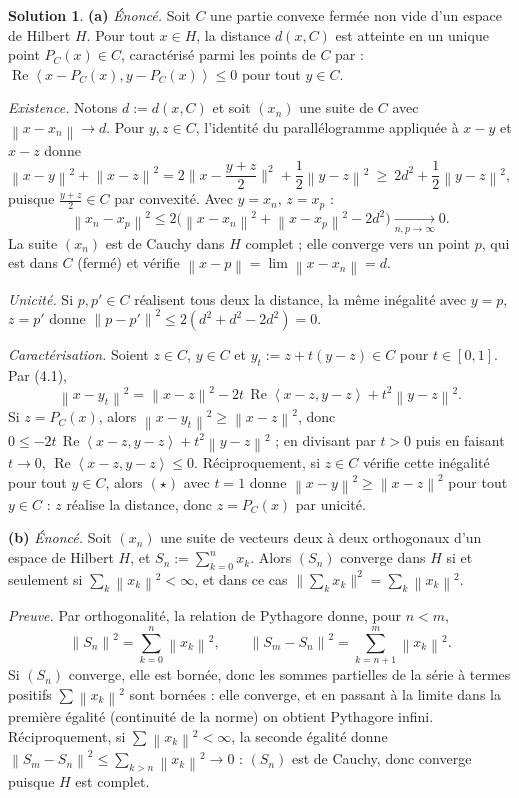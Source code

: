 \documentclass[11pt,a4paper]{article}
\newcommand{\norm}[1]{\left\|#1\right\|}
\newcommand{\ps}[2]{\left\langle #1,#2\right\rangle}
\renewcommand{\Re}{\operatorname{Re}}
\theoremstyle{definition}
\newtheorem*{solution}{Solution}
\begin{document}
\begin{solution}
\noindent\textbf{(a)} \emph{Énoncé.} Soit $C$ une partie convexe fermée non vide d'un espace de Hilbert $H$. Pour tout $x\in H$, la distance $d(x,C)$ est atteinte en un unique point $P_C(x)\in C$, caractérisé parmi les points de $C$ par : $\Re\ps{x-P_C(x)}{y-P_C(x)}\le0$ pour tout $y\in C$.

\emph{Existence.} Notons $d:=d(x,C)$ et soit $(x_n)$ une suite de $C$ avec $\norm{x-x_n}\to d$. Pour $y,z\in C$, l'identité du parallélogramme appliquée à $x-y$ et $x-z$ donne
\[
\norm{x-y}^2+\norm{x-z}^2=2\Big\|x-\frac{y+z}2\Big\|^2+\frac12\norm{y-z}^2\ \ge\ 2d^2+\frac12\norm{y-z}^2 ,
\]
puisque $\frac{y+z}2\in C$ par convexité. Avec $y=x_n$, $z=x_p$ :
\[
\norm{x_n-x_p}^2\le2\big(\norm{x-x_n}^2+\norm{x-x_p}^2-2d^2\big)\xrightarrow[n,p\to\infty]{}0 .
\]
La suite $(x_n)$ est de Cauchy dans $H$ complet ; elle converge vers un point $p$, qui est dans $C$ (fermé) et vérifie $\norm{x-p}=\lim\norm{x-x_n}=d$.

\emph{Unicité.} Si $p,p'\in C$ réalisent tous deux la distance, la même inégalité avec $y=p$, $z=p'$ donne $\norm{p-p'}^2\le2(d^2+d^2-2d^2)=0$.

\emph{Caractérisation.} Soient $z\in C$, $y\in C$ et $y_t:=z+t(y-z)\in C$ pour $t\in[0,1]$. Par (4.1),
\[
\norm{x-y_t}^2=\norm{x-z}^2-2t\,\Re\ps{x-z}{y-z}+t^2\norm{y-z}^2 .\tag{$\star$}
\]
Si $z=P_C(x)$, alors $\norm{x-y_t}^2\ge\norm{x-z}^2$, donc $0\le-2t\,\Re\ps{x-z}{y-z}+t^2\norm{y-z}^2$ ; en divisant par $t>0$ puis en faisant $t\to0$, $\Re\ps{x-z}{y-z}\le0$. Réciproquement, si $z\in C$ vérifie cette inégalité pour tout $y\in C$, alors $(\star)$ avec $t=1$ donne $\norm{x-y}^2\ge\norm{x-z}^2$ pour tout $y\in C$ : $z$ réalise la distance, donc $z=P_C(x)$ par unicité.

\medskip
\noindent\textbf{(b)} \emph{Énoncé.} Soit $(x_n)$ une suite de vecteurs deux à deux orthogonaux d'un espace de Hilbert $H$, et $S_n:=\sum_{k=0}^nx_k$. Alors $(S_n)$ converge dans $H$ si et seulement si $\sum_k\norm{x_k}^2<\infty$, et dans ce cas $\big\|\sum_kx_k\big\|^2=\sum_k\norm{x_k}^2$.

\emph{Preuve.} Par orthogonalité, la relation de Pythagore donne, pour $n<m$,
\[
\norm{S_n}^2=\sum_{k=0}^n\norm{x_k}^2,\qquad\norm{S_m-S_n}^2=\sum_{k=n+1}^m\norm{x_k}^2 .
\]
Si $(S_n)$ converge, elle est bornée, donc les sommes partielles de la série à termes positifs $\sum\norm{x_k}^2$ sont bornées : elle converge, et en passant à la limite dans la première égalité (continuité de la norme) on obtient Pythagore infini. Réciproquement, si $\sum\norm{x_k}^2<\infty$, la seconde égalité donne $\norm{S_m-S_n}^2\le\sum_{k>n}\norm{x_k}^2\to0$ : $(S_n)$ est de Cauchy, donc converge puisque $H$ est complet.


\end{solution}
\end{document}
